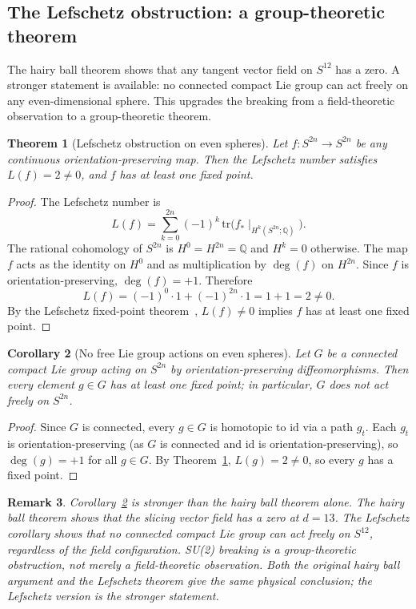 \documentclass[12pt,a4paper]{article}
\newtheorem{theorem}{Theorem}[section]
\newtheorem{corollary}[theorem]{Corollary}
\newtheorem{remark}[theorem]{Remark}
\begin{document}
\subsection{The Lefschetz obstruction: a group-theoretic theorem}

The hairy ball theorem shows that any tangent vector field on $S^{12}$ has a zero. A
stronger statement is available: no connected compact Lie group can act freely on any
even-dimensional sphere. This upgrades the breaking from a field-theoretic observation to
a group-theoretic theorem.

\begin{theorem}[Lefschetz obstruction on even spheres]\label{thm:lefschetz}
Let $f\colon S^{2n}\to S^{2n}$ be any continuous orientation-preserving map. Then
the Lefschetz number satisfies $L(f)=2\neq 0$, and $f$ has at least one fixed point.
\end{theorem}
\begin{proof}
The Lefschetz number is
\[
L(f)=\sum_{k=0}^{2n}(-1)^k\,\mathrm{tr}\!\bigl(f_*\mid_{H^k(S^{2n};\mathbb{Q})}\bigr).
\]
The rational cohomology of $S^{2n}$ is $H^0=H^{2n}=\mathbb{Q}$ and $H^k=0$ otherwise.
The map $f$ acts as the identity on $H^0$ and as multiplication by $\deg(f)$ on $H^{2n}$.
Since $f$ is orientation-preserving, $\deg(f)=+1$. Therefore
\[
L(f)=(-1)^0\cdot 1+(-1)^{2n}\cdot 1=1+1=2\neq 0.
\]
By the Lefschetz fixed-point theorem~\cite{lefschetz}, $L(f)\neq 0$ implies $f$ has at
least one fixed point.
\end{proof}

\begin{corollary}[No free Lie group actions on even spheres]\label{cor:no-free}
Let $G$ be a connected compact Lie group acting on $S^{2n}$ by orientation-preserving
diffeomorphisms. Then every element $g\in G$ has at least one fixed point; in particular,
$G$ does not act freely on $S^{2n}$.
\end{corollary}
\begin{proof}
Since $G$ is connected, every $g\in G$ is homotopic to $\mathrm{id}$ via a path $g_t$.
Each $g_t$ is orientation-preserving (as $G$ is connected and $\mathrm{id}$ is
orientation-preserving), so $\deg(g)=+1$ for all $g\in G$. By
Theorem~\ref{thm:lefschetz}, $L(g)=2\neq 0$, so every $g$ has a fixed point.
\end{proof}

\begin{remark}
Corollary~\ref{cor:no-free} is stronger than the hairy ball theorem alone. The hairy ball
theorem shows that the \emph{slicing vector field} has a zero at $d=13$. The Lefschetz
corollary shows that \emph{no connected compact Lie group can act freely on} $S^{12}$,
regardless of the field configuration. SU(2) breaking is a group-theoretic obstruction,
not merely a field-theoretic observation. Both the original hairy ball argument and the
Lefschetz theorem give the same physical conclusion; the Lefschetz version is the stronger
statement.
\end{remark}
\end{document}
